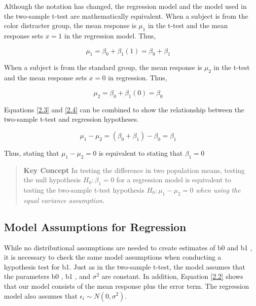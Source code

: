 \documentclass[
]{report}
\begin{document}
Although the notation has changed, the regression model and the model used in the two-sample t-test are mathematically equivalent. When a subject is from the color distracter group, the mean response is \(\mu_1\) in the t-test and the mean response sets \(x = 1\) in the regression model. Thus,

\begin{equation}
\label{2.3} \mu_1 = \beta_0 + \beta_1(1)  = \beta_0 + \beta_1 \tag{2.3}
\end{equation}

When a subject is from the standard group, the mean response is \(\mu_2\) in the t-test and the mean response sets \(x = 0\) in regression. Thus,

\begin{equation}
\label{2.4} \mu_2 = \beta_0 + \beta_1(0)  = \beta_0 \tag{2.4}
\end{equation}

Equations \ref{2.3} and \ref{2.4} can be combined to show the relationship between the two-sample t-test and regression hypotheses.

\begin{equation}
\label{2.5} \mu_1 - \mu_2 = (\beta_0 + \beta_1) -  \beta_0 = \beta_1 \tag{2.5}
\end{equation}

Thus, stating that \(\mu_1 - \mu_2 = 0\) is equivalent to stating that \(\beta_1 = 0\)

\begin{quote}
\textbf{Key Concept}
In testing the difference in two population means, testing the null hypothesis \(H_0 : \beta_1 = 0\) for a regression model is equivalent to testing the two-sample t-test hypothesis \(H_0 : \mu_1 - \mu_2 = 0\) \emph{when using the equal variance assumption}.
\end{quote}

\subsection{Model Assumptions for Regression}\label{model-assumptions-for-regression}

While no distributional assumptions are needed to create estimates of b0 and b1 , it is necessary to check the same model assumptions when conducting a hypothesis test for b1. Just as in the two-sample t-test, the model assumes that the parameters b0 , b1 , and \(\sigma^2\) are constant. In addition, Equation \ref{2.2} shows that our model consists of the mean response plus the error term. The regression model also assumes that \(\epsilon_i \sim N(0,\sigma^2)\).
\end{document}

